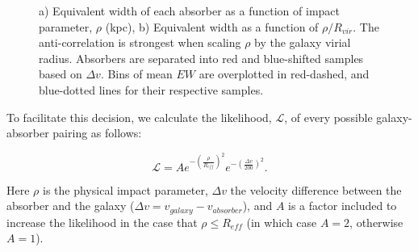 \documentclass[iop]{emulateapj-rtx4}
\begin{document}
\begin{figure}[t]
\centering
{}
\caption{\small{a) Equivalent width of each absorber as a function of impact parameter, $\rho$ (kpc), b) Equivalent width as a function of $\rho/R_{vir}$. The anti-correlation is strongest when scaling $\rho$ by the galaxy virial radius. Absorbers are separated into red and blue-shifted samples based on $\Delta v$. Bins of mean $EW$ are overplotted in red-dashed, and blue-dotted lines for their respective samples.}}
\vspace{5pt}
\end{figure}


To facilitate this decision, we calculate the likelihood, $\mathcal{L}$, of every possible galaxy-absorber pairing as follows:

\begin{equation}
	\mathcal{L} = A e^{-(\frac{\rho}{R_{eff}})^2} e^{-(\frac{\Delta v}{200})^2}.
\end{equation}


\noindent Here $\rho$ is the physical impact parameter, $\Delta v$ the velocity difference between the absorber and the galaxy ($\Delta v = v_{galaxy} - v_{absorber}$), and $A$ is a factor included to increase the likelihood in the case that $\rho \leq R_{eff}$ (in which case $A = 2$, otherwise $A = 1$). 
\end{document}
